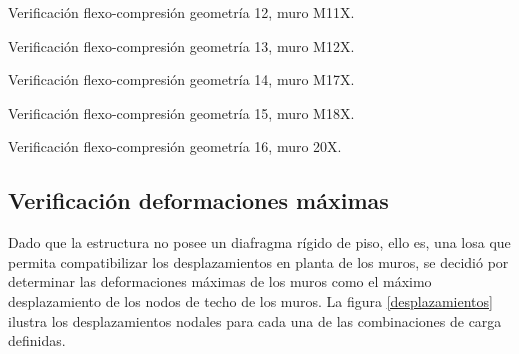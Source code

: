 \begin{images}{Verificación flexo-compresión geometría 12, muro M11X.}
\end{images}

\begin{images}{Verificación flexo-compresión geometría 13, muro M12X.}
\end{images}

\begin{images}{Verificación flexo-compresión geometría 14, muro M17X.}
\end{images}

\begin{images}{Verificación flexo-compresión geometría 15, muro M18X.}
\end{images}

\begin{images}{Verificación flexo-compresión geometría 16, muro 20X.}
\addimagenewline

\end{images}

\newpage
\subsection{Verificación deformaciones máximas}

Dado que la estructura no posee un diafragma rígido de piso, ello es, una losa que permita compatibilizar los desplazamientos en planta de los muros, se decidió por determinar las deformaciones máximas de los muros como el máximo desplazamiento de los nodos de techo de los muros. La figura \ref{desplazamientos} ilustra los desplazamientos nodales para cada una de las combinaciones de carga definidas.%


